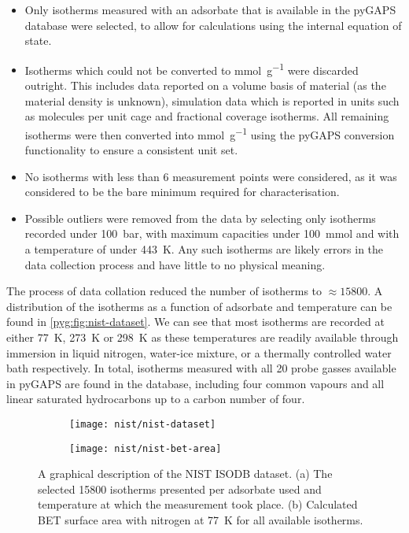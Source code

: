 \begin{itemize}
	\item Only isotherms measured with an adsorbate that is available
	      in the pyGAPS database were selected, to allow for calculations
	      using the internal equation of state.
	\item Isotherms which could not be converted to \si{\milli\mol\per\gram}
	      were discarded outright. This includes data reported
	      on a volume basis of material (as the material density is
	      unknown), simulation data which is reported in units such
	      as molecules per unit cage and fractional coverage isotherms.
	      All remaining isotherms were then converted into
	      \si{\milli\mol\per\gram} using the pyGAPS conversion
	      functionality to ensure a consistent unit set.
	\item No isotherms with less than 6 measurement points were
	      considered, as it was considered to be the bare
	      minimum required for characterisation.
	\item Possible outliers were removed from the data by selecting
	      only isotherms recorded under \SI{100}{\bar}, with maximum capacities
	      under \SI{100}{\milli\mol} and with a temperature of under
	      \SI{443}{\kelvin}. Any such isotherms are likely errors in the
	      data collection process and have little to no physical meaning.
\end{itemize}

The process of data collation reduced the number of isotherms
to \(\approx \! 15800\). A distribution of the isotherms as a
function of adsorbate and temperature can be found
in \autoref{pyg:fig:nist-dataset}.
We can see that most isotherms are recorded at either
\SI{77}{\kelvin}, \SI{273}{\kelvin} or \SI{298}{\kelvin} as
these temperatures are readily available through immersion
in liquid nitrogen, water-ice mixture, or a thermally controlled
water bath respectively. In total, isotherms measured with all 20
probe gasses available in pyGAPS are found in the database,
including four common vapours and all linear saturated hydrocarbons
up to a carbon number of four.

\begin{figure}[htb]
	\centering

	\begin{subfigure}[b]{0.5\linewidth}
		\texttt{[image: nist/nist-dataset]}%
		\caption{}%
		\label{pyg:fig:nist-dataset}
	\end{subfigure}%
	\begin{subfigure}[b]{0.45\linewidth}
		\texttt{[image: nist/nist-bet-area]}%
		\caption{}%
		\label{pyg:fig:nist-dataset-area}
	\end{subfigure}%

	\caption{A graphical description of the NIST ISODB dataset.
		(a) The selected 15800 isotherms presented per adsorbate used
		and temperature at which the measurement took place.
		(b) Calculated BET surface area with nitrogen at \SI{77}{\kelvin}
		for all available isotherms. }%
	\label{pyg:fig:nist-set}
\end{figure}

